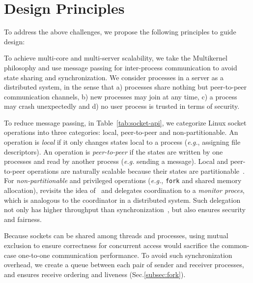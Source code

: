 \section{Design Principles}
\label{sec:architecture}

To address the above challenges, we propose the following principles to guide \sys design:

To achieve multi-core and multi-server scalability, we take the Multikernel~\cite{baumann2009multikernel} philosophy and use message passing for inter-process communication to avoid state sharing and synchronization. We consider processes in a server as a distributed system, in the sense that a) processes share nothing but peer-to-peer communication channels, b) new processes may join at any time, c) a process may crash unexpectedly and d) no user process is trusted in terms of security. 

To reduce message passing, in Table~\ref{tab:socket-api}, we categorize Linux socket operations into three categories: local, peer-to-peer and non-partitionable. An operation is \textit{local} if it only changes states local to a process (\textit{e.g.}, assigning file descriptors). An operation is \textit{peer-to-peer} if the states are written by one processes and read by another process (\textit{e.g.} sending a message).
Local and peer-to-peer operations are naturally scalable because their states are partitionable~\cite{partitionable}. For \textit{non-partitionable} and privileged operations (\textit{e.g.}, \texttt{fork} and shared memory allocation), \sys revisits the idea of~\cite{hoare1974monitors} and delegates coordination to a \emph{monitor proces}, which is analogous to the coordinator in a distributed system. Such delegation not only has higher throughput than synchronization~\cite{roghanchi2017ffwd}, but also ensures security and fairness.

Because sockets can be shared among threads and processes, using mutual exclusion to ensure correctness for concurrent access would sacrifice the common-case one-to-one communication performance. To avoid such synchronization overhead, we create a queue between each pair of sender and receiver processes, and ensures receive ordering and liveness (Sec.\ref{subsec:fork}).

